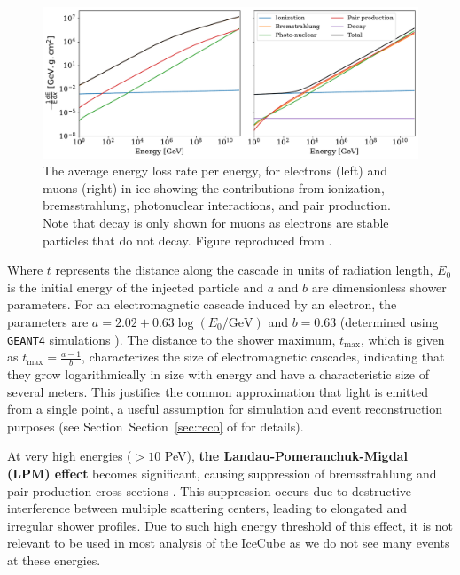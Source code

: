 \begin{figure}
	\centering \includegraphics{./figures/nu_in_icecube/energylosses.pdf}
	\caption[Energy loss profile of electrons and muons in ice]{The average energy loss rate per energy, for electrons (left) and muons (right) in
    ice showing the contributions from ionization, bremsstrahlung, photonuclear interactions, and pair production. Note that decay is only shown for muons as electrons are stable particles that do not decay. Figure reproduced from \cite{MMC_paper}.}
\end{figure}


Where $t$ represents the distance along the cascade in units of radiation length, $E_0$ is the initial energy of the injected particle and $a$ and $b$ are dimensionless shower parameters. For an electromagnetic cascade induced by an electron, the parameters are $a = 2.02 + 0.63 \log(E_0/\text{GeV})$ and $b = 0.63$ (determined using \texttt{GEANT4} simulations  ). The distance to the shower maximum, $t_{\text{max}}$, which is given as $t_{\text{max}}=\frac{a-1}{b}$, characterizes the size of electromagnetic cascades, indicating that they grow logarithmically in size with energy and have a characteristic size of several meters. This justifies the common approximation that light is emitted from a single point, a useful assumption for simulation and event reconstruction purposes (see Section~Section~\ref{sec:reco} of  for details).

At very high energies ($>10$ PeV), \textbf{the Landau-Pomeranchuk-Migdal (LPM) effect} becomes significant, causing suppression of bremsstrahlung and pair production cross-sections . This suppression occurs due to destructive interference between multiple scattering centers, leading to elongated and irregular shower profiles. Due to such high energy threshold of this effect, it is not relevant to be used in most analysis of the IceCube as we do not see many events at these energies.

